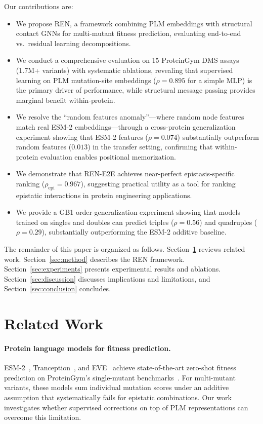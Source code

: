 \documentclass{article}
\newcommand{\ren}{\textsc{REN}}
\newcommand{\rene}{\textsc{REN-E2E}}
\begin{document}
Our contributions are:
\begin{itemize}
    \item We propose \ren{}, a framework combining PLM embeddings with structural contact GNNs for multi-mutant fitness prediction, evaluating end-to-end vs.\ residual learning decompositions.
    \item We conduct a comprehensive evaluation on 15 ProteinGym DMS assays (1.7M+ variants) with systematic ablations, revealing that supervised learning on PLM mutation-site embeddings ($\rho = 0.895$ for a simple MLP) is the primary driver of performance, while structural message passing provides marginal benefit within-protein.
    \item We resolve the ``random features anomaly''---where random node features match real ESM-2 embeddings---through a cross-protein generalization experiment showing that ESM-2 features ($\rho = 0.074$) substantially outperform random features ($0.013$) in the transfer setting, confirming that within-protein evaluation enables positional memorization.
    \item We demonstrate that \rene{} achieves near-perfect epistasis-specific ranking ($\rho_\text{epi} = 0.967$), suggesting practical utility as a tool for ranking epistatic interactions in protein engineering applications.
    \item We provide a GB1 order-generalization experiment showing that models trained on singles and doubles can predict triples ($\rho = 0.56$) and quadruples ($\rho = 0.29$), substantially outperforming the ESM-2 additive baseline.
\end{itemize}

The remainder of this paper is organized as follows. Section~\ref{sec:related} reviews related work. Section~\ref{sec:method} describes the \ren{} framework. Section~\ref{sec:experiments} presents experimental results and ablations. Section~\ref{sec:discussion} discusses implications and limitations, and Section~\ref{sec:conclusion} concludes.

\section{Related Work}
\label{sec:related}

\paragraph{Protein language models for fitness prediction.}
ESM-2~\citep{lin2023evolutionary}, Tranception~\citep{notin2022tranception}, and EVE~\citep{frazer2021disease} achieve state-of-the-art zero-shot fitness prediction on ProteinGym's single-mutant benchmarks~\citep{notin2024proteingym}. For multi-mutant variants, these models sum individual mutation scores under an additive assumption that systematically fails for epistatic combinations. Our work investigates whether supervised corrections on top of PLM representations can overcome this limitation.
\end{document}
